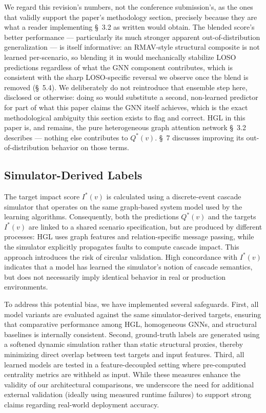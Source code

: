 \documentclass[review]{elsarticle}
\begin{document}
We regard this revision's numbers, not the conference submission's, as the ones that validly
support the paper's methodology section, precisely because they are what a reader implementing
\S~3.2 as written would obtain. The blended score's better performance --- particularly its much
stronger apparent out-of-distribution generalization --- is itself informative: an RMAV-style
structural composite is not learned per-scenario, so blending it in would mechanically stabilize
LOSO predictions regardless of what the GNN component contributes, which is consistent with the
sharp LOSO-specific reversal we observe once the blend is removed (\S~5.4). We deliberately do not
reintroduce that ensemble step here, disclosed or otherwise: doing so would substitute a second,
non-learned predictor for part of what this paper claims the GNN itself achieves, which is the
exact methodological ambiguity this section exists to flag and correct. HGL in this paper is, and
remains, the pure heterogeneous graph attention network \S~3.2 describes --- nothing else
contributes to $Q^*(v)$. \S~7 discusses improving its out-of-distribution behavior on those terms.

\subsection{Simulator-Derived Labels}

The target impact score $I^*(v)$ is calculated using a discrete-event cascade simulator that
operates on the same graph-based system model used by the learning algorithms. Consequently, both
the predictions $Q^*(v)$ and the targets $I^*(v)$ are linked to a shared scenario specification,
but are produced by different processes: HGL uses graph features and relation-specific message
passing, while the simulator explicitly propagates faults to compute cascade impact. This approach
introduces the risk of circular validation. High concordance with $I^*(v)$ indicates that a model
has learned the simulator's notion of cascade semantics, but does not necessarily imply identical
behavior in real or production environments.

To address this potential bias, we have implemented several safeguards. First, all model variants
are evaluated against the same simulator-derived targets, ensuring that comparative performance
among HGL, homogeneous GNNs, and structural baselines is internally consistent. Second,
ground-truth labels are generated using a softened dynamic simulation rather than static structural
proxies, thereby minimizing direct overlap between test targets and input features. Third, all
learned models are tested in a feature-decoupled setting where pre-computed centrality metrics are
withheld as input. While these measures enhance the validity of our architectural comparisons, we
underscore the need for additional external validation (ideally using measured runtime failures) to
support strong claims regarding real-world deployment accuracy.
\end{document}
